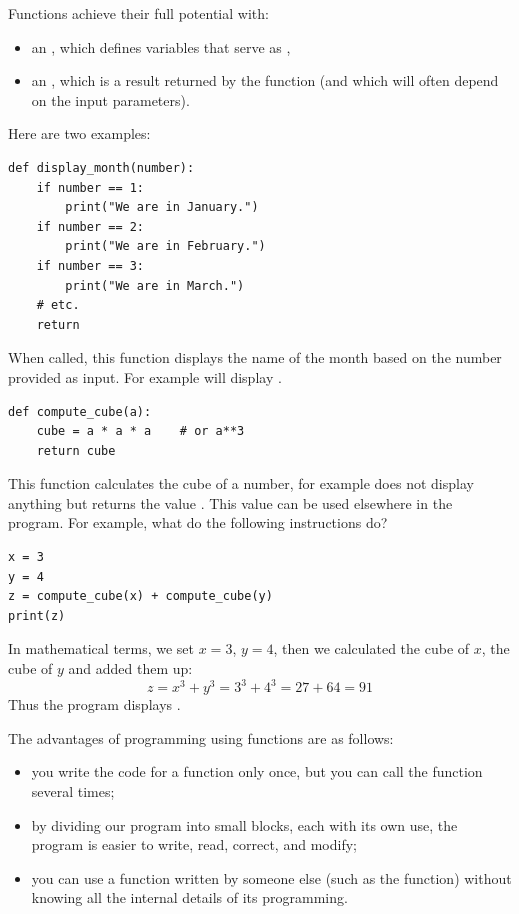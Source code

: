 \documentclass[11pt,class=report,crop=false]{standalone}
\begin{document}
\begin{cours}

Functions achieve their full potential with:
\begin{itemize}
  \item an , which defines variables that serve as ,
  \item an , which is a result returned by the function (and which will often depend on the input parameters).
\end{itemize}

Here are two examples:
\begin{center}
\begin{lstlisting}
def display_month(number):
    if number == 1:
        print("We are in January.")
    if number == 2:
        print("We are in February.")
    if number == 3:
        print("We are in March.")
    # etc.
    return
\end{lstlisting}
\end{center}
When called, this function displays the name of the month based on the number provided as input. For example  will display .

\begin{center}
\begin{lstlisting}
def compute_cube(a):
    cube = a * a * a    # or a**3
    return cube
\end{lstlisting}

\end{center}

This function calculates the cube of a number, for example  does not display anything but returns the value . This value can be used elsewhere in the program.
For example, what do the following instructions do?
\begin{center}
\begin{lstlisting}
x = 3
y = 4
z = compute_cube(x) + compute_cube(y)
print(z)
\end{lstlisting}
\end{center}
In mathematical terms, we set $x=3$, $y=4$, then we calculated the cube of $x$, the cube of $y$ and added them up:
$$z = x^3 + y^3 = 3^3 + 4^3 = 27 + 64 = 91$$
Thus the program displays .

The advantages of programming using functions are as follows:
\begin{itemize}
  \item you write the code for a function only once, but you can call the function several times;
  \item by dividing our program into small blocks, each with its own use, the program is easier to write, read, correct, and modify;
  \item you can use a function written by someone else (such as the  function) without knowing all the internal details of its programming.
\end{itemize} 

\end{cours}
\end{document}
